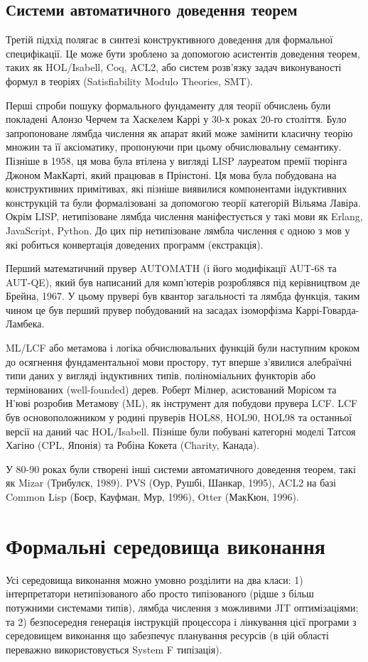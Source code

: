 \subsection{Системи автоматичного доведення теорем}
Третій підхід полягає в синтезі конструктивного доведення
для формальної специфікації. Це може бути зроблено за
допомогою асистентів доведення теорем, таких як HOL/Isabell, Coq, ACL2,
або систем розв'язку задач виконуваності формул в теоріях (Satisfiability
Modulo Theories, SMT).

Перші спроби пошуку формального фундаменту для теорії обчислень були покладені
Алонзо Черчем та Хаскелем Каррі у 30-х роках 20-го століття. Було запропоноване
лямбда числення як апарат який може замінити класичну теорію множин та її аксіоматику,
пропонуючи при цьому обчислювальну семантику. Пізніше в 1958, ця мова була втілена
у вигляді LISP лауреатом премії тюрінга Джоном МакКарті, який працював в Прінстоні.
Ця мова була побудована на конструктивних примітивах, які пізніше виявилися компонентами
індуктивних конструкцій та були формалізовані за допомогою
теорії категорій Вільяма Лавіра. Окрім LISP, нетипізоване лямбда числення
маніфестується у такі мови як Erlang, JavaScript, Python.
До цих пір нетипізоване лямбла числення є одною з мов у які робиться
конвертація доведених программ (екстракція).

Перший математичний прувер AUTOMATH (і його модифікації AUT-68 та AUT-QE),
який був написаний для комп'ютерів розроблявся під керівництвом де Брейна, 1967.
У цьому прувері був квантор загальності та лямбда функція, таким чином це був перший прувер
побудований на засадах ізоморфізма Каррі-Говарда-Ламбека.

ML/LCF або метамова і логіка обчислювальних функцій були наступним кроком до
осягнення фундаментальної мови простору, тут вперше з'явилися алебраїчні типи даних
у вигляді індуктивних типів, поліноміальних функторів або термінованих (well-founded) дерев.
Роберт Мілнер, асистований Морісом та Н'юві розробив Метамову (ML), як
інструмент для побудови прувера LCF. LCF був основоположником у родині пруверів
HOL88, HOL90, HOL98 та останньої версії на даний час HOL/Isabell.
Пізніше були побувані категорні моделі Татсоя Хагіно (CPL, Японія)
та Робіна Кокета (Charity, Канада).

У 80-90 роках були створені інші системи автоматичного доведення теорем,
такі як Mizar (Трибулєк, 1989). PVS (Оур, Рушбі, Шанкар, 1995),
ACL2 на базі Common Lisp (Боєр, Кауфман, Мур, 1996), Otter (МакКюн, 1996).

\section{Формальні середовища виконання}
Усі середовища виконання можно умовно розділити на два класи:
1) інтерпретатори нетипізованого або просто
типізованого (рідше з більш потужними системами типів),
лямбда числення з можливими JIT оптимізаціями; та 2)
безпосередня генерація інструкцій процессора і лінкування цієї програми з
середовищем виконання що забезпечує планування ресурсів
(в цій області переважно використовується System F типізація).

